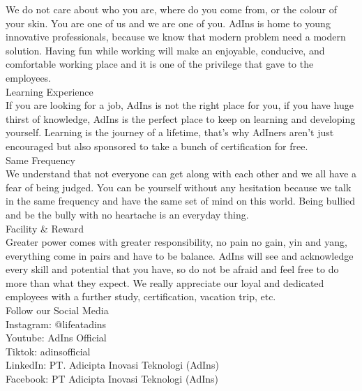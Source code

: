 \documentclass[12pt,titlepage]{article}
\begin{document}
We do not care about who you are, where do you come from, or the colour of your skin. You are one of us and we are one of you. AdIns is home to young innovative professionals, because we know that modern problem need a modern solution. Having fun while working will make an enjoyable, conducive, and comfortable working place and it is one of the privilege that gave to the employees. \\

Learning Experience \\

If you are looking for a job, AdIns is not the right place for you, if you have huge thirst of knowledge, AdIns is the perfect place to keep on learning and developing yourself. Learning is the journey of a lifetime, that's why AdIners aren't just encouraged but also sponsored to take a bunch of certification for free. \\

Same Frequency \\

We understand that not everyone can get along with each other and we all have a fear of being judged. You can be yourself without any hesitation because we talk in the same frequency and have the same set of mind on this world. Being bullied and be the bully with no heartache is an everyday thing. \\

Facility \& Reward \\

Greater power comes with greater responsibility, no pain no gain, yin and yang, everything come in pairs and have to be balance. AdIns will see and acknowledge every skill and potential that you have, so do not be afraid and feel free to do more than what they expect. We really appreciate our loyal and dedicated employees with a further study, certification, vacation trip, etc. \\

Follow our Social Media \\
Instagram: @lifeatadins \\
Youtube: AdIns Official \\
Tiktok: adins\textunderscore official \\
LinkedIn: PT. Adicipta Inovasi Teknologi (AdIns) \\
Facebook: PT Adicipta Inovasi Teknologi (AdIns) \\
\end{document}
